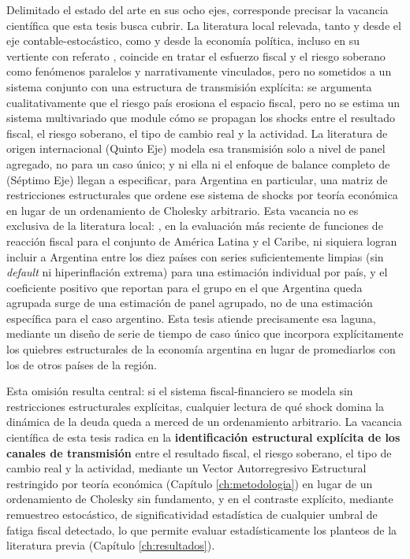 Delimitado el estado del arte en sus ocho ejes, corresponde precisar la vacancia científica que esta tesis busca cubrir. La literatura local relevada, tanto \citet{rodriguez2023} y \citet{sanches2019} desde el eje contable-estocástico, como \citet{aruguete2021} y \citet{cantamutto2024} desde la economía política, incluso en su vertiente con referato \citep{bohoslavsky2024}, coincide en tratar el esfuerzo fiscal y el riesgo soberano como fenómenos paralelos y narrativamente vinculados, pero no sometidos a un sistema conjunto con una estructura de transmisión explícita: se argumenta cualitativamente que el riesgo país erosiona el espacio fiscal, pero no se estima un sistema multivariado que module cómo se propagan los shocks entre el resultado fiscal, el riesgo soberano, el tipo de cambio real y la actividad. La literatura de origen internacional (Quinto Eje) modela esa transmisión solo a nivel de panel agregado, no para un caso único; y ni ella ni el enfoque de balance completo de \citet{levyyeyati2021} (Séptimo Eje) llegan a especificar, para Argentina en particular, una matriz de restricciones estructurales que ordene ese sistema de shocks por teoría económica en lugar de un ordenamiento de Cholesky arbitrario. Esta vacancia no es exclusiva de la literatura local: \citet{gonzalez2023}, en la evaluación más reciente de funciones de reacción fiscal para el conjunto de América Latina y el Caribe, ni siquiera logran incluir a Argentina entre los diez países con series suficientemente limpias (sin \textit{default} ni hiperinflación extrema) para una estimación individual por país, y el coeficiente positivo que reportan para el grupo en el que Argentina queda agrupada surge de una estimación de panel agrupado, no de una estimación específica para el caso argentino. Esta tesis atiende precisamente esa laguna, mediante un diseño de serie de tiempo de caso único que incorpora explícitamente los quiebres estructurales de la economía argentina en lugar de promediarlos con los de otros países de la región.

Esta omisión resulta central: si el sistema fiscal-financiero se modela sin restricciones estructurales explícitas, cualquier lectura de qué shock domina la dinámica de la deuda queda a merced de un ordenamiento arbitrario. La vacancia científica de esta tesis radica en la \textbf{identificación estructural explícita de los canales de transmisión} entre el resultado fiscal, el riesgo soberano, el tipo de cambio real y la actividad, mediante un Vector Autorregresivo Estructural restringido por teoría económica (Capítulo \ref{ch:metodologia}) en lugar de un ordenamiento de Cholesky sin fundamento, y en el contraste explícito, mediante remuestreo estocástico, de significatividad estadística de cualquier umbral de fatiga fiscal detectado, lo que permite evaluar estadísticamente los planteos de la literatura previa (Capítulo \ref{ch:resultados}).

